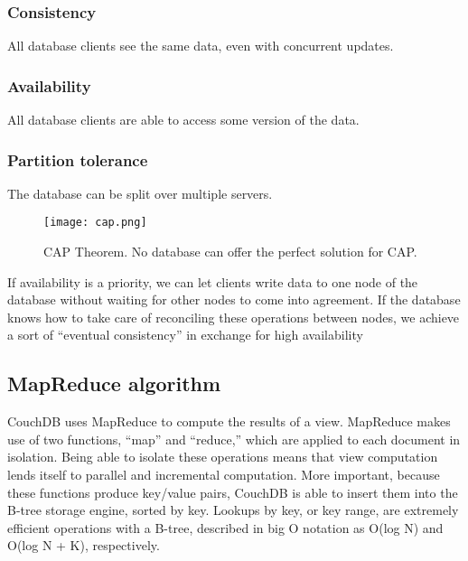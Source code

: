 \subsubsection{Consistency}

All database clients see the same data, even with concurrent updates.

\subsubsection{Availability}

All database clients are able to access some version of the data.

\subsubsection{Partition tolerance}

The database can be split over multiple servers.

\begin{figure}[h!]
    \begin{center}
        \texttt{[image: cap.png]}
    \end{center}
    \caption{CAP Theorem. No database can offer the perfect solution for CAP.}
    \label{fig:cap}
\end{figure}

If availability is a priority, we can let clients write data to one node of the database without waiting for other nodes to come into agreement. If the database knows how to take care of reconciling these operations between nodes, we achieve a sort of “eventual consistency” in exchange for high availability

\subsection{MapReduce algorithm}

CouchDB uses MapReduce to compute the results of a view. MapReduce makes use of two functions, “map” and “reduce,” which are applied to each document in isolation. Being able to isolate these operations means that view computation lends itself to parallel and incremental computation. More important, because these functions produce key/value pairs, CouchDB is able to insert them into the B-tree storage engine, sorted by key. Lookups by key, or key range, are extremely efficient operations with a B-tree, described in big O notation as O(log N) and O(log N + K), respectively.




